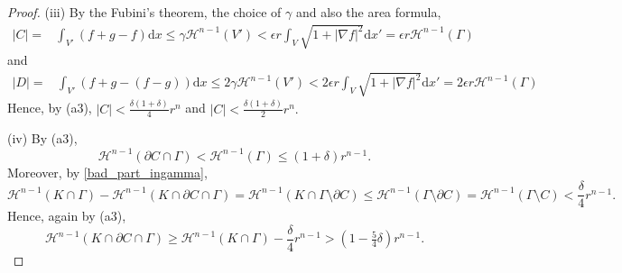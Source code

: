 \documentclass[reqno]{amsart}
\numberwithin{equation}{section}
\theoremstyle{plain}
\theoremstyle{definition}
\newcommand{\cH}{\mathcal{H}}
\newcommand{\p}{\partial}
\renewcommand{\d}{\mathrm{d}}
\begin{document}
\begin{proof}
(iii) By the Fubini's theorem, the choice of $\gamma$ and also the area formula,
\begin{align*}
|C| = & \int_{V'} (f+g -f)\d x\le \gamma \cH^{n-1}(V') <
\epsilon r \int_V \sqrt{1+|\nabla f|^2}\d x' =\epsilon r \cH^{n-1}(\Gamma) 
\end{align*}
and 
\begin{align*}
|D| = & \int_{V'} (f+g -(f-g))\d x\le 2\gamma \cH^{n-1}(V') <
2\epsilon r \int_V \sqrt{1+|\nabla f|^2}\d x' =2\epsilon r \cH^{n-1}(\Gamma) 
\end{align*}
Hence, by (a3), $|C| < \frac{\delta(1+\delta)}{4}r^n$ and $|C| < \frac{\delta(1+\delta)}{2}r^n.$


(iv) By (a3),
$$
\cH^{n-1}(\p C\cap \Gamma) < \cH^{n-1}(\Gamma) \le (1+\delta)r^{n-1}.
$$
Moreover, by \eqref{bad_part_ingamma},
$$
\cH^{n-1}(K\cap \Gamma) - \cH^{n-1}(K\cap \p C\cap \Gamma) =
\cH^{n-1}(K\cap\Gamma\setminus \p C) \le \cH^{n-1}(\Gamma\setminus \p C) =\cH^{n-1}(\Gamma\setminus C) < \frac{\delta}{4}r^{n-1}.
$$
Hence, again by (a3),
$$
\cH^{n-1}(K\cap \p C\cap \Gamma)  \ge \cH^{n-1}(K\cap\Gamma)-\frac{\delta}{4}r^{n-1}>(1-\tfrac54\delta)r^{n-1}.
$$


\end{proof}
\end{document}
